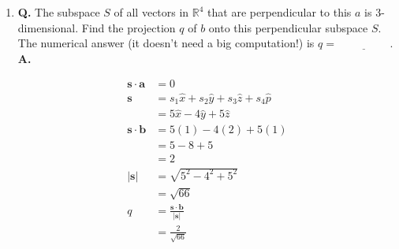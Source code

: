 \documentclass[main.tex]{subfiles}
\begin{document}
\begin{enumerate}
\begin{enumerate}
$$\begin{aligned}
\begin{array}{l}
    10 \\
    4 \\
    8
    \end{array}\right] \\
    & = \frac{1}{7} \left[\begin{array}{l}
    3 \\
    4 \\
    3 \\
    -8
    \end{array}\right] \\
    \bm{e} \cdot \bm{a} & = \frac{1}{7} \left[\begin{array}{l}
    3 \\
    4 \\
    3 \\
    -8
    \end{array}\right] \cdot \left[\begin{array}{l}
    2 \\
    5 \\
    2 \\
    4
    \end{array}\right] \\
    & = \frac{1}{7} \left[6 + 20 + 6 - 32 \right] \\
    & = 0
    \end{aligned}
    $$
    
    \item [b.] \textbf{Q.} The subspace $S$ of all vectors in $\mathbb{R}^{4}$ that are perpendicular to this $a$ is 3-dimensional. Find the projection $q$ of $b$ onto this perpendicular subspace $S$. The numerical answer (it doesn't need a big computation!) is $q=\underline{\hspace{2cm}}$.
    \textbf{A.}

    $$
    \begin{aligned}
    \bm{s} \cdot \bm{a} & = 0\\
    \bm{s} &= s_{1} \hat{x} + s_{2} \hat{y} + s_{3} \hat{z} +s_{4} \hat{p}\\
    & = 5 \hat{x} - 4 \hat{y} + 5 \hat{z}\\
    \bm{s} \cdot \bm{b} &= 5(1)-4(2)+5(1) \\
    & = 5-8+5 \\
    & = 2 \\
    |\bm{s}| & = \sqrt{5^{2}-4^{2}+5^{2}} \\
    & = \sqrt{66} \\
    q &= \frac{\bm{s} \cdot \bm{b}}{|\bm{s}|}\\
    & = \frac{2}{\sqrt{66}}
    \end{aligned}
    $$
    

\end{enumerate}
\end{enumerate}
\end{document}
